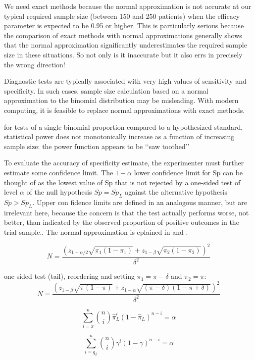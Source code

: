 \documentclass{article}
\begin{document}
We need exact methods because the normal approximation is not accurate at our typical required sample size (between 150 and 250 patients) when the  efficacy parameter is expected to be 0.95 or higher. This is particularly serious because the comparison of exact methods with normal approximations generally shows that the normal approximation significantly underestimates the required sample size in these situations. So not only is it inaccurate but it also errs in precisely the wrong direction!

Diagnostic tests are typically associated with very high values of sensitivity and specificity. In such cases, sample size calculation based on a normal approximation to the binomial distribution may be misleading. With modern computing, it is feasible to replace normal approximations with exact methods.\cite{chu2007sample}

for tests of a single binomial proportion compared to a hypothesized standard, statistical power does not monotonically increase as a function of increasing sample size: the power function appears to be ‘‘saw toothed’’\cite{chu2007sample}

To evaluate the accuracy of specificity estimate, the experimenter must further estimate some confidence limit. The $1-\alpha$ lower confidence limit for Sp can be thought of as the lowest value of Sp that is not rejected by a one-sided test of level $\alpha$ of the null hypothesis $Sp = Sp_L$ against the alternative hypothesis $Sp > Sp_L$. Upper con fidence limits are defined in an analogous manner, but are irrelevant here, because the concern is that the test actually performs worse, not better, than indicated by the observed proportion of positive outcomes in the trial sample.\cite{flahault2005sample}. The normal approximation is eplained in \cite{machin1997sample} and \cite{hajian2014sample}.

\begin{equation}
N = \frac{\left(z_{1-\alpha/2}\sqrt{\pi_{1}\left(1-\pi_{1}\right)} + z_{1-\beta}\sqrt{\pi_{2}\left(1-\pi_{2}\right)} \right)^2}{\delta^2}
\end{equation}

one sided test (tail), reordering and setting $\pi_{1}=\pi - \delta$ and $\pi_{2}=\pi$:
\begin{equation}
  \label{eq:normalaprox}
N = \frac{\left(z_{1-\beta}\sqrt{\pi\left(1-\pi\right)} + z_{1-\alpha}\sqrt{\left(\pi - \delta\right)\left(1-\pi+\delta\right)} \right)^2}{\delta^2}
\end{equation}

\begin{equation}
\sum_{i = x}^n {n\choose i}\hat{\pi}_L^i(1 - \hat{\pi}_L)^{n-i} = \alpha
\end{equation}

\begin{equation}
\sum_{i = q_{\beta}}^n {n\choose i}\gamma^i(1 - \gamma)^{n-i} = \alpha
\end{equation}


\end{document}
